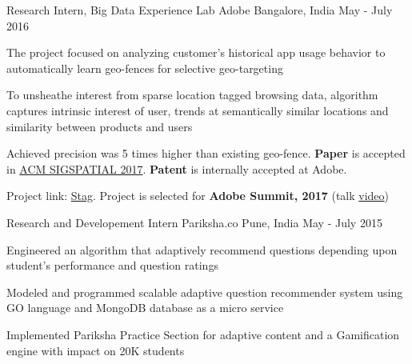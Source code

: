 

\begin{cventries}

  \cventry
    {Research Intern, Big Data Experience Lab} %
    {Adobe} %
    {Bangalore, India} %
    {May - July 2016} %
    {
      \begin{cvitems} %
        \item {The project focused on analyzing customer’s historical app usage behavior to automatically learn geo-fences for selective geo-targeting}
        \item { To unsheathe interest from sparse location tagged browsing data, algorithm captures intrinsic interest of user, trends at semantically similar locations and similarity between products and users}
        \item Achieved precision was 5 times higher than existing geo-fence. \textbf{Paper} is accepted in \href{http://sigspatial2017.sigspatial.org/accepted-papers/}{ACM SIGSPATIAL 2017}. \textbf{Patent} is internally accepted at Adobe.  
        \item Project link:  \href{https://research.adobe.com/project/smart-geo-fencing/}{Stag}. Project is selected for \textbf{Adobe Summit, 2017} (talk \href{https://www.youtube.com/watch?v=PS0imh951ZE}{video}) 
      \end{cvitems}
    }

  \cventry
    {Research and Developement Intern} %
    {Pariksha.co} %
    {Pune, India} %
    {May - July 2015} %
    {
      \begin{cvitems} 
      	\item {Engineered an algorithm that adaptively recommend questions depending upon student’s performance and question ratings}
      	\item {Modeled and programmed scalable adaptive question recommender system using GO language and MongoDB database as a micro service}
      	\item {Implemented Pariksha Practice Section for adaptive content and a Gamification engine with impact on 20K students}
      \end{cvitems}
    }
\end{cventries}
